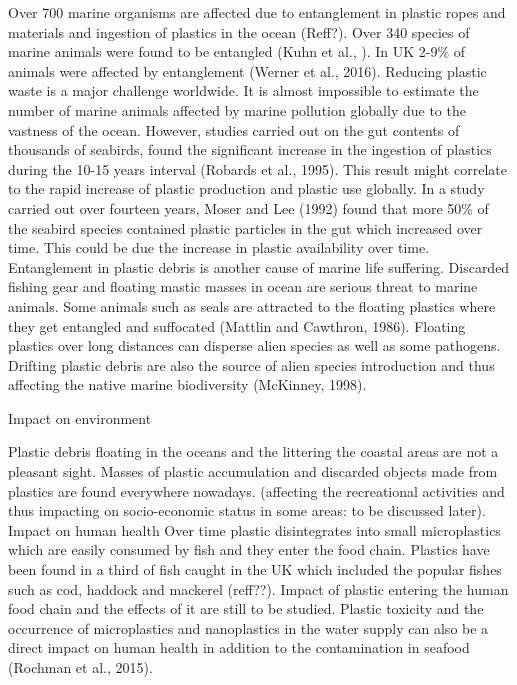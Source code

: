 \documentclass[10pt]{article}\usepackage[]{graphicx}\usepackage[]{color}
\begin{document}
Over 700 marine organisms are affected due to entanglement in plastic ropes and materials and ingestion of plastics in the ocean (Reff?). Over 340 species of marine animals were found to be entangled (Kuhn et al., ). In UK 2-9\% of animals were affected by entanglement (Werner et al., 2016). Reducing plastic waste is a major challenge worldwide. It is almost impossible to estimate the number of marine animals affected by marine pollution globally due to the vastness of the ocean. However, studies carried out on the gut contents of thousands of seabirds, found the significant increase in the ingestion of plastics during the 10-15 years interval (Robards et al., 1995). This result might correlate to the rapid increase of plastic production and plastic use globally.  In a study carried out over fourteen years, Moser and Lee (1992) found that more 50\% of the seabird species contained plastic particles in the gut which increased over time. This could be due the increase in plastic availability over time. 
Entanglement in plastic debris is another cause of marine life suffering. Discarded fishing gear and floating mastic masses in ocean are serious threat to marine animals. Some animals such as seals are attracted to the floating plastics where they get entangled and suffocated (Mattlin and Cawthron, 1986). Floating plastics over long distances can disperse alien species as well as some pathogens. Drifting plastic debris are also the source of alien species introduction and thus affecting the native marine biodiversity (McKinney, 1998). 

Impact on environment

Plastic debris floating in the oceans and the littering the coastal areas are not a pleasant sight. Masses of plastic accumulation and discarded objects made from plastics are found everywhere nowadays. (affecting the recreational activities and thus impacting on socio-economic status in some areas: to be discussed later).
Impact on human health
Over time plastic disintegrates into small microplastics which are easily consumed by fish and they enter the food chain. Plastics have been found in a third of fish caught in the UK which included the popular fishes such as cod, haddock and mackerel (reff??). Impact of plastic entering the human food chain and the effects of it are still to be studied.  Plastic toxicity and the occurrence of microplastics and nanoplastics in the water supply can also be a direct impact on human health in addition to the contamination in seafood (Rochman et al., 2015). 
\end{document}
